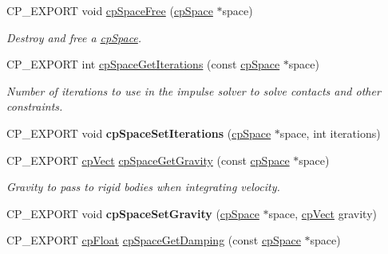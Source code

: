 \begin{DoxyCompactItemize}
\mbox{\label{group__cp_space_gab1bc162df996c03493be80d8220e5c8a}} 
C\+P\+\_\+\+E\+X\+P\+O\+RT void \mbox{\hyperlink{group__cp_space_gab1bc162df996c03493be80d8220e5c8a}{cp\+Space\+Free}} (\mbox{\hyperlink{structcp_space}{cp\+Space}} $\ast$space)
\begin{DoxyCompactList}\small\item\em Destroy and free a \mbox{\hyperlink{structcp_space}{cp\+Space}}. \end{DoxyCompactList}\item 
\mbox{\label{group__cp_space_ga7e1bd8b3f1090018f65f8b798c99df79}} 
C\+P\+\_\+\+E\+X\+P\+O\+RT int \mbox{\hyperlink{group__cp_space_ga7e1bd8b3f1090018f65f8b798c99df79}{cp\+Space\+Get\+Iterations}} (const \mbox{\hyperlink{structcp_space}{cp\+Space}} $\ast$space)
\begin{DoxyCompactList}\small\item\em Number of iterations to use in the impulse solver to solve contacts and other constraints. \end{DoxyCompactList}\item 
\mbox{\label{group__cp_space_ga8975460871b3e9d3a6d89a4339742ea3}} 
C\+P\+\_\+\+E\+X\+P\+O\+RT void {\bfseries cp\+Space\+Set\+Iterations} (\mbox{\hyperlink{structcp_space}{cp\+Space}} $\ast$space, int iterations)
\item 
\mbox{\label{group__cp_space_ga6270c6c036bcdd6adaeb59aac7bf6549}} 
C\+P\+\_\+\+E\+X\+P\+O\+RT \mbox{\hyperlink{structcp_vect}{cp\+Vect}} \mbox{\hyperlink{group__cp_space_ga6270c6c036bcdd6adaeb59aac7bf6549}{cp\+Space\+Get\+Gravity}} (const \mbox{\hyperlink{structcp_space}{cp\+Space}} $\ast$space)
\begin{DoxyCompactList}\small\item\em Gravity to pass to rigid bodies when integrating velocity. \end{DoxyCompactList}\item 
\mbox{\label{group__cp_space_ga5ed619ffc8d4f3405316a6646d1e751c}} 
C\+P\+\_\+\+E\+X\+P\+O\+RT void {\bfseries cp\+Space\+Set\+Gravity} (\mbox{\hyperlink{structcp_space}{cp\+Space}} $\ast$space, \mbox{\hyperlink{structcp_vect}{cp\+Vect}} gravity)
\item 
C\+P\+\_\+\+E\+X\+P\+O\+RT \mbox{\hyperlink{group__basic_types_gac1ed65573e035bf892505768c852d8d3}{cp\+Float}} \mbox{\hyperlink{group__cp_space_gac00ad0e4956e444fa23874fae68df3b7}{cp\+Space\+Get\+Damping}} (const \mbox{\hyperlink{structcp_space}{cp\+Space}} $\ast$space)

\end{DoxyCompactItemize}
